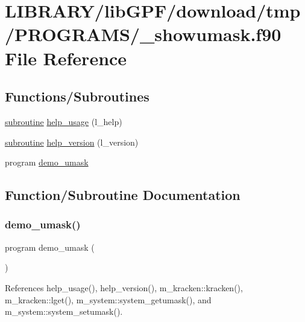 \hypertarget{__showumask_8f90}{}\section{L\+I\+B\+R\+A\+R\+Y/lib\+G\+P\+F/download/tmp/\+P\+R\+O\+G\+R\+A\+M\+S/\+\_\+showumask.f90 File Reference}
\label{__showumask_8f90}
\subsection*{Functions/\+Subroutines}
\begin{DoxyCompactItemize}
\item 
\hyperlink{M__stopwatch_83_8txt_acfbcff50169d691ff02d4a123ed70482}{subroutine} \hyperlink{__showumask_8f90_a3e09a3b52ee8fb04eeb93fe5761626a8}{help\+\_\+usage} (l\+\_\+help)
\item 
\hyperlink{M__stopwatch_83_8txt_acfbcff50169d691ff02d4a123ed70482}{subroutine} \hyperlink{__showumask_8f90_a39c21619b08a3c22f19e2306efd7f766}{help\+\_\+version} (l\+\_\+version)
\item 
program \hyperlink{__showumask_8f90_a1b5ccb693a5e379113ec98bc98f16a90}{demo\+\_\+umask}
\end{DoxyCompactItemize}


\subsection{Function/\+Subroutine Documentation}
\mbox{\label{__showumask_8f90_a1b5ccb693a5e379113ec98bc98f16a90}} 
\subsubsection{\texorpdfstring{demo\+\_\+umask()}{demo\_umask()}}
{\footnotesize\ttfamily program demo\+\_\+umask (\begin{DoxyParamCaption}{ }\end{DoxyParamCaption})}



References help\+\_\+usage(), help\+\_\+version(), m\+\_\+kracken\+::kracken(), m\+\_\+kracken\+::lget(), m\+\_\+system\+::system\+\_\+getumask(), and m\+\_\+system\+::system\+\_\+setumask().

